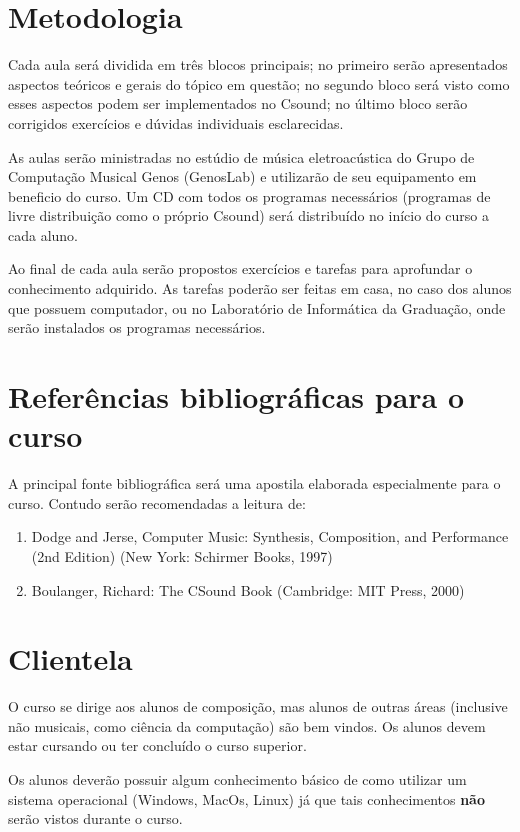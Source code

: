 \documentclass[12pt,brazil]{article}
\begin{document}
\section{Metodologia}

Cada aula será dividida em três blocos principais; no primeiro serão
apresentados aspectos teóricos e gerais do tópico em questão; no
segundo bloco será visto como esses aspectos podem ser implementados
no Csound; no último bloco serão corrigidos exercícios e dúvidas
individuais esclarecidas.

As aulas serão ministradas no estúdio de música eletroacústica do
Grupo de Computação Musical Genos (GenosLab) e utilizarão de seu
equipamento em beneficio do curso. Um CD com todos os programas
necessários (programas de livre distribuição como o próprio Csound)
será distribuído no início do curso a cada aluno.

Ao final de cada aula serão propostos exercícios e tarefas para
aprofundar o conhecimento adquirido. As tarefas poderão ser feitas em
casa, no caso dos alunos que possuem computador, ou no Laboratório de
Informática da Graduação, onde serão instalados os programas
necessários.

\section{Referências bibliográficas para o curso}
A principal fonte bibliográfica será uma apostila elaborada
especialmente para o curso. Contudo serão recomendadas a leitura de:

\begin{enumerate}
\item Dodge and Jerse, Computer Music: Synthesis, Composition, and
  Performance (2nd Edition) (New York: Schirmer Books, 1997)
\item Boulanger, Richard: The CSound Book (Cambridge: MIT Press, 2000)
 \end{enumerate}

\section{Clientela}
O curso se dirige aos alunos de composição, mas alunos de outras áreas
(inclusive não musicais, como ciência da computação) são bem vindos.
Os alunos devem estar cursando ou ter concluído o curso superior.
  
Os alunos deverão possuir algum conhecimento básico de como utilizar
um sistema operacional (Windows, MacOs, Linux) já que tais
conhecimentos \textbf{não} serão vistos durante o curso.
\end{document}
